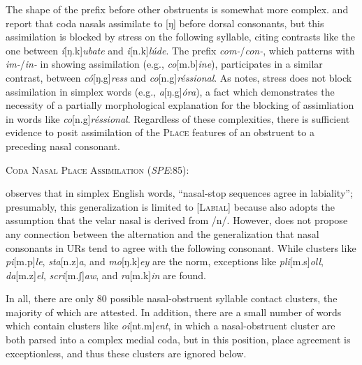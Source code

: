 \noindent
The shape of the prefix before other obstruents is somewhat more complex. 
\citet[][62]{Halle1985a} and \citet[][90]{Borowsky1986} report that coda nasals assimilate to [ŋ] before dorsal consonants, but this assimilation is blocked by stress on the following syllable, citing contrasts like the one between \emph{í}[ŋ.k]\emph{ubate} and \emph{i}[n.k]\emph{lúde}. The prefix \emph{com-}/\emph{con-}, which patterns with \emph{im-}/\emph{in-} in showing assimilation (e.g., \emph{co}[m.b]\emph{ine}), participates in a similar contrast, between \emph{có}[ŋ.g]\emph{ress} and \emph{co}[n.g]\emph{réssional}. As \citeauthor{Borowsky1986} notes, stress does not block assimilation in simplex words (e.g., \emph{a}[ŋ.g]\emph{óra}), a fact which demonstrates the necessity of a partially morphological explanation for the blocking of assimliation in words like \emph{co}[n.g]\emph{réssional}. Regardless of these complexities, there is sufficient evidence to posit assimilation of the \textsc{Place} features of an obstruent to a preceding nasal consonant. 

\ex \textsc{Coda Nasal Place Assimilation} (\emph{SPE}:85): \\
\label{CNPA}
\xe

\citet[][175]{Pierrehumbert1994} observes that in simplex English words, ``nasal-stop sequences agree in labiality''; presumably, this generalization is limited to [\textsc{Labial}] because \citeauthor{Pierrehumbert1994} also adopts the assumption that the velar nasal is derived from /n/. However, \citeauthor{Pierrehumbert1994} does not propose any connection between the alternation and the generalization that nasal consonants in URs tend to agree with the following consonant. While clusters like \emph{pi}[m.p]\emph{le}, \emph{sta}[n.z]\emph{a}, and \emph{mo}[ŋ.k]\emph{ey} are the norm, exceptions like \emph{pli}[m.s]\emph{oll}, \emph{da}[m.z]\emph{el}, \emph{scri}[m.ʃ]\emph{aw}, and \emph{ra}[m.k]\emph{in} are found.

In all, there are only 80 possible nasal-obstruent syllable contact clusters, the majority of which are attested. In addition, there are a small number of words which contain clusters like \emph{oi}[nt.m]\emph{ent}, in which a nasal-obstruent cluster are both parsed into a complex medial coda, but in this position, place agreement is exceptionless, and thus these clusters are ignored below.

